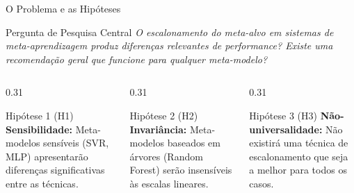 \documentclass[aspectratio=169, 10pt]{beamer}
\begin{document}
\begin{frame}{O Problema e as Hipóteses}
  \begin{alertblock}{Pergunta de Pesquisa Central}
    \textit{O escalonamento do meta-alvo em sistemas de meta-aprendizagem produz diferenças relevantes de performance? Existe uma recomendação geral que funcione para qualquer meta-modelo?}
  \end{alertblock}
  
  \vspace{0.3cm}
  
  \begin{columns}[T]
    \begin{column}{0.31\textwidth}
      \begin{block}{Hipótese 1 (H1)}
        \small
        \textbf{Sensibilidade:} Meta-modelos sensíveis (SVR, MLP) apresentarão diferenças significativas entre as técnicas.
      \end{block}
    \end{column}
    \begin{column}{0.31\textwidth}
      \begin{block}{Hipótese 2 (H2)}
        \small
        \textbf{Invariância:} Meta-modelos baseados em árvores (Random Forest) serão insensíveis às escalas lineares.
      \end{block}
    \end{column}
    \begin{column}{0.31\textwidth}
      \begin{block}{Hipótese 3 (H3)}
        \small
        \textbf{Não-universalidade:} Não existirá uma técnica de escalonamento que seja a melhor para todos os casos.
      \end{block}
    \end{column}
  \end{columns}
\end{frame}
\end{document}
